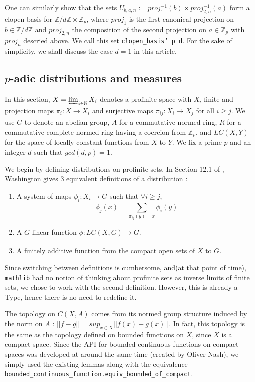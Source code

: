 \documentclass[a4paper,UKenglish,cleveref, autoref, thm-restate]{lipics-v2021}
\newcommand{\lean}[1]{\texttt{#1}\xspace} %
\begin{document}
One can similarly show that the sets $U_{b, a, n} := proj_1^{-1} (b) \times proj_{2,n} ^{-1} (a)$ form a clopen basis for 
$\mathbb{Z} / d \mathbb{Z} \times \mathbb{Z}_p$, where $proj_1$ is the first canonical projection on $b \in \mathbb{Z} / d \mathbb{Z}$ 
and $proj_{2,n}$ the composition of the second projection on $a \in \mathbb{Z}_p$ with $proj_n$ descried above. We call this set 
\lean{clopen\_basis' p d}. For the sake of simplicity, we shall discuss the case $d = 1$ in this article.

\subsection{$p$-adic distributions and measures}
In this section, $X = \varprojlim_{i \in \mathbb{N}} X_i$ denotes a profinite space with $X_i$ finite and
projection maps $\pi_i : X \xrightarrow[]{} X_i$ and surjective maps
$\pi_{ij} : X_i \xrightarrow[]{} X_j$ for all $i \ge j$. We use $G$ to denote an abelian group,
$A$ for a commutative normed ring, $R$ for a commutative complete normed ring having a coercion from $\mathbb{Z}_p$, 
and $LC(X,Y)$ for the space of locally constant functions from $X$ to $Y$. 
We fix a prime $p$ and an integer $d$ such that $gcd(d, p) =1$. 

We begin by defining distributions on profinite sets. In Section 12.1 of \cite{cyc}, Washington
gives 3 equivalent definitions of a distribution :
\begin{enumerate}
  \item A system of maps $\phi_i : X_i \xrightarrow[]{} G$ such that $\forall i \ge j$,
  $$ \phi_j(x) = \sum_{\pi_{ij}(y) = x} \phi_i(y) $$
  \item A $G$-linear function $\phi : LC(X, G) \xrightarrow[]{} G$.
  \item A finitely additive function from the compact open sets of $X$ to $G$.
\end{enumerate}

Since switching between definitions is cumbersome, and(at that point of time), \lean{mathlib}
had no notion of thinking about profinite sets as inverse limits of finite sets, we chose to work
with the second definition. However, this is already a Type, hence there is no need to redefine it.

The topology on $C(X, A)$ comes from its normed group structure induced by the norm on $A$ :
$|| f - g || = sup_{x \in X} || f(x) - g(x) ||$. In fact, this topology is the same as the 
topology defined on bounded functions on $X$, since $X$ is a compact space. Since the API for bounded 
continuous functions on compact spaces was developed at around the same time (created by Oliver Nash), 
we simply used the existing lemmas along with the equivalence 
\lean{bounded\_continuous\_function.equiv\_bounded\_of\_compact}. 
\end{document}
